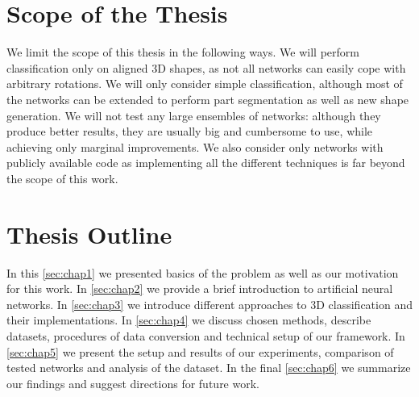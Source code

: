\section{Scope of the Thesis}
We limit the scope of this thesis in the following ways. We will perform classification only on aligned 3D shapes, as not all networks can easily cope with arbitrary rotations. We will only consider simple classification, although most of the networks can be extended to perform part segmentation as well as new shape generation. We will not test any large ensembles of networks: although they produce better results, they are usually big and cumbersome to use, while achieving only marginal improvements. We also consider only networks with publicly available code as implementing all the different techniques is far beyond the scope of this work.

\section{Thesis Outline}
In this \autoref{sec:chap1} we presented basics of the problem as well as our motivation for this work. In \autoref{sec:chap2} we provide a brief introduction to artificial neural networks. In  \autoref{sec:chap3} we introduce different approaches to 3D classification and their implementations. In \autoref{sec:chap4} we discuss chosen methods, describe datasets, procedures of data conversion and technical setup of our framework. In  \autoref{sec:chap5} we present the setup and results of our experiments, comparison of tested networks and analysis of the dataset. In the final  \autoref{sec:chap6} we summarize our findings and suggest directions for future work.
